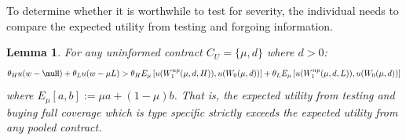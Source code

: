 \documentclass[nonatbib,preprint,12pt]{elsarticle}
\theoremstyle{plain}
\newtheorem{lemma}[theorem]{Lemma}
\newtheorem{prop}[theorem]{Proposition}
\theoremstyle{definition}
\theoremstyle{plain}
\theoremstyle{TheoremNum}
\theoremstyle{CorollaryNum}
\theoremstyle{PropositionNum}
\theoremstyle{TheoremNum}
\begin{document}


To determine whether it is worthwhile to test for severity, the individual needs to compare the expected utility from testing and forgoing information.

\iffalse
\begin{lemma}\label{lemma:alwaysbuy}
    For any uninformed contract $C_U = \{\mu,d\}$ where $d>0$:
    \begin{align*}
        \theta_H u (w-\muH)+\theta_L u(w-\mu L)>\theta_H E_\mu \left[u(W_{1}^{np}(\mu,d,H)),u(W_0(\mu,d))\right]+\theta_L E_\mu\left[u(W_1^{np}(\mu,d,L)),u(W_0(\mu,d))\right]
    \end{align*}
    where $E_\mu[a,b]:= \mu a + (1-\mu)b$. That is, the expected utility from testing and buying full coverage which is type specific strictly exceeds the expected utility from any pooled contract.
\end{lemma}
\end{document}
